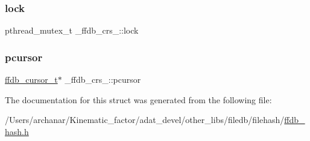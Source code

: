 \mbox{\label{struct__ffdb__crs___a91ff97087fd24de639a6efce36da30e2}} 
\subsubsection{\texorpdfstring{lock}{lock}}
{\footnotesize\ttfamily pthread\+\_\+mutex\+\_\+t \+\_\+ffdb\+\_\+crs\+\_\+\+::lock}

\mbox{\label{struct__ffdb__crs___ad0d04ea484ea452ea3f04c9685b69a01}} 
\subsubsection{\texorpdfstring{pcursor}{pcursor}}
{\footnotesize\ttfamily \mbox{\hyperlink{other__libs_2filedb_2filehash_2ffdb__db_8h_a1383f6fb3966b0ca74206ba93b687fd9}{ffdb\+\_\+cursor\+\_\+t}}$\ast$ \+\_\+ffdb\+\_\+crs\+\_\+\+::pcursor}



The documentation for this struct was generated from the following file\+:\begin{DoxyCompactItemize}
\item 
/\+Users/archanar/\+Kinematic\+\_\+factor/adat\+\_\+devel/other\+\_\+libs/filedb/filehash/\mbox{\hyperlink{ffdb__hash_8h}{ffdb\+\_\+hash.\+h}}\end{DoxyCompactItemize}
